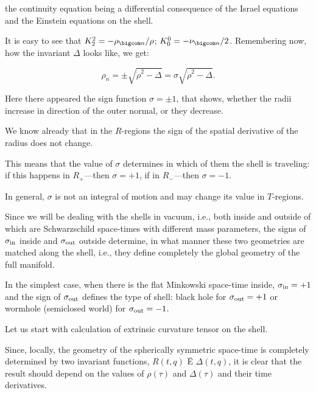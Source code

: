 the continuity equation being a differential consequence of the Israel equations and the Einstein equations on the shell. 

It is easy to see that $K^2_2 = - {\rho_{\bigcom n}}/{\rho}$; $K^0_0 = - {\nu_{\bigcom n}}/{2}$. Remembering now, how the invariant $\Delta$ looks like, we get:

\begin{equation}

\label{ron}

\rho_n = \pm \sqrt{\dot \rho^2 - \Delta} = \sigma \sqrt{\dot \rho^2 - \Delta} .

\end{equation}

Here there appeared the sign function $\sigma = \pm 1$, that shows, whether the radii increase in direction of the outer normal, or they decrease. 

We know already that in the $R$-regions the sign of the spatial derivative of the radius does not change. 

This means that the value of $\sigma$ determines in which of them the shell is traveling: if this happens in $R_+$---then  $\sigma = + 1$, if in $R_-$---then $\sigma = - 1$. 

In general, $\sigma$ is not an integral of motion and may change its value in $T$-regions. 

Since we will be dealing with the shells in vacuum, i.e., both inside and outside of which are Schwarzschild space-times with different mass parameters, the signs of $\sigma _{\rm in}$ inside and $\sigma_{\rm out}$ outside determine, in what manner these two geometries are matched along the shell, i.e., they define completely the global geometry of the full manifold. 

In the simplest case, when there is the flat Minkowski space-time inside, $\sigma_{\rm in} = + 1$ and the sign of $\sigma_{\rm out}$ defines the type of shell: black hole for $\sigma_{\rm out} = +1$ or wormhole (semiclosed world) for $\sigma_{\rm out} = -1$.



Let us start with calculation of extrinsic curvature tensor on the shell. 

Since, locally, the geometry of the spherically symmetric space-time is completely deter\-mi\-ned by two invariant functions, $R(t, q)$ Ë $\Delta(t, q)$, it is clear that the result should depend on the values of $\rho(\tau)$ and $\Delta(\tau)$ and their time derivatives. 

